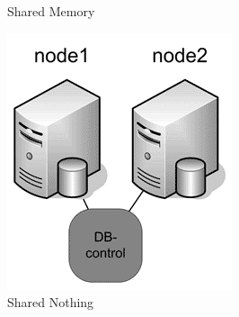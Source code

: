 \begin{figure}[h]
\begin{subfigure}[b]{0.2\textwidth}
		\caption{Shared Memory}
	\end{subfigure}
	\hfill
	\begin{subfigure}[b]{0.2\textwidth}
		\includegraphics[width=\textwidth]{7/07_03.png}
		\caption{Shared Nothing}
	\end{subfigure}
	\hfill
	\begin{subfigure}[b]{0.2\textwidth}

\end{subfigure}
\end{figure}
